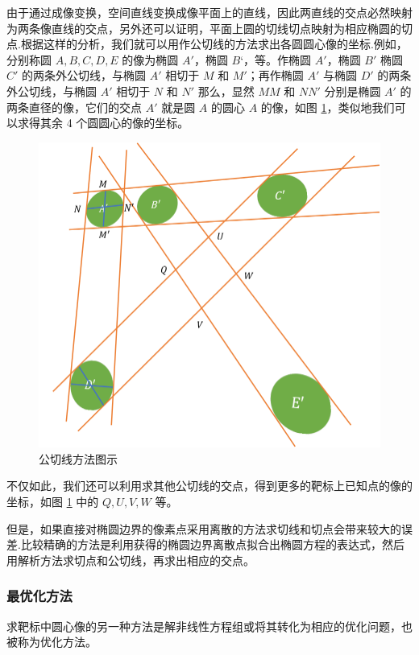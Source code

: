 \documentclass{article}
\numberwithin{equation}{section}						%
\numberwithin{figure}{section}							%
\begin{document}
\begin{sloppypar}
	由于通过成像变换，空间直线变换成像平面上的直线，因此两直线的交点必然映射为两条像直线的交点，另外还可以证明，平面上圆的切线切点映射为相应椭圆的切点.根据这样的分析，我们就可以用作公切线的方法求出各圆圆心像的坐标.例如，分别称圆 $A, B, C, D, E$ 的像为椭圆 $A'$，椭圆 $B‘$，等。作椭圆 $A'$，椭圆 $B'$ 椭圆 $C'$ 的两条外公切线，与椭圆 $A'$ 相切于 $M$ 和 $M'$；再作椭圆 $A'$ 与椭圆 $D'$ 的两条外公切线，与椭圆 $A'$ 相切于 $N$ 和 $N'$ 那么，显然 $MM$ 和 $NN'$ 分别是椭圆 $A'$ 的两条直径的像，它们的交点 $A'$ 就是圆 $A$ 的圆心 $A$ 的像，如图 \ref{babiao_gongqiexian}，类似地我们可以求得其余 4 个圆圆心的像的坐标。
	\begin{figure}[H]
		\centering
		\includegraphics[width=0.6\linewidth]{babiao_gongqiexian}
		\caption{公切线方法图示}
		\label{babiao_gongqiexian}
	\end{figure}
	
	不仅如此，我们还可以利用求其他公切线的交点，得到更多的靶标上已知点的像的坐标，如图 \ref{babiao_gongqiexian} 中的 $Q, U, V, W$ 等。
	
	但是，如果直接对椭圆边界的像素点采用离散的方法求切线和切点会带来较大的误差.比较精确的方法是利用获得的椭圆边界离散点拟合出椭圆方程的表达式，然后用解析方法求切点和公切线，再求出相应的交点。
	\subsubsection{最优化方法}
	求靶标中圆心像的另一种方法是解非线性方程组或将其转化为相应的优化问题，也被称为优化方法。
	

\end{sloppypar}
\end{document}
